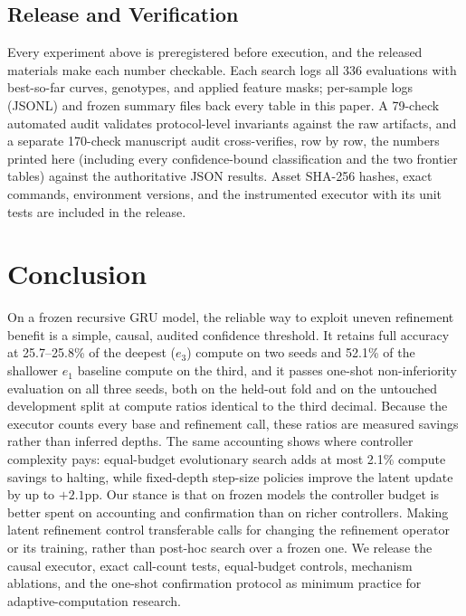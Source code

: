 ﻿\documentclass[11pt]{article}
\begin{document}
\subsection{Release and Verification}
\label{sec:exp-release}
Every experiment above is preregistered before execution, and the released materials make each number checkable. Each search logs all 336 evaluations with best-so-far curves, genotypes, and applied feature masks; per-sample logs (JSONL) and frozen summary files back every table in this paper. A 79-check automated audit validates protocol-level invariants against the raw artifacts, and a separate 170-check manuscript audit cross-verifies, row by row, the numbers printed here (including every confidence-bound classification and the two frontier tables) against the authoritative JSON results. Asset SHA-256 hashes, exact commands, environment versions, and the instrumented executor with its unit tests are included in the release.

\section{Conclusion}
\label{sec:conclusion}
On a frozen recursive GRU model, the reliable way to exploit uneven refinement benefit is a simple, causal, audited confidence threshold. It retains full accuracy at 25.7--25.8\% of the deepest ($e_3$) compute on two seeds and 52.1\% of the shallower $e_1$ baseline compute on the third, and it passes one-shot non-inferiority evaluation on all three seeds, both on the held-out fold and on the untouched development split at compute ratios identical to the third decimal. Because the executor counts every base and refinement call, these ratios are measured savings rather than inferred depths. The same accounting shows where controller complexity pays: equal-budget evolutionary search adds at most 2.1\% compute savings to halting, while fixed-depth step-size policies improve the latent update by up to $+2.1$pp. Our stance is that on frozen models the controller budget is better spent on accounting and confirmation than on richer controllers. Making latent refinement control transferable calls for changing the refinement operator or its training, rather than post-hoc search over a frozen one. We release the causal executor, exact call-count tests, equal-budget controls, mechanism ablations, and the one-shot confirmation protocol as minimum practice for adaptive-computation research.
\end{document}

